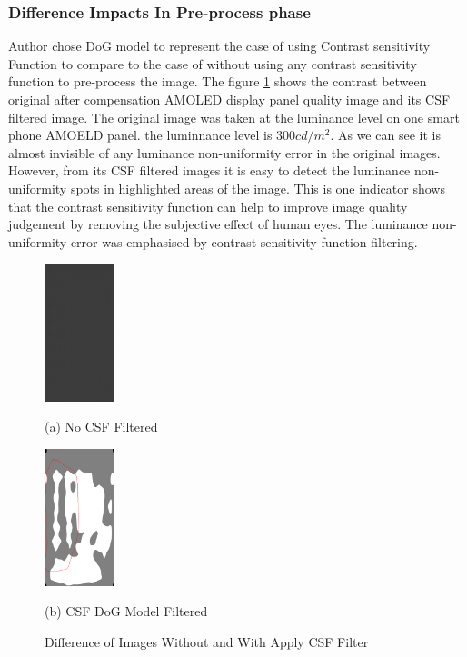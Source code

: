 \documentclass{article}
\begin{document}
\subsubsection{Difference Impacts In Pre-process phase}
Author chose DoG model to represent the case of using Contrast sensitivity Function to compare to the case of without using any contrast sensitivity function to pre-process the image.  
The figure \ref{fig3} shows the contrast between  original after compensation AMOLED display panel quality image and its CSF filtered image. The original image was taken at the luminance level on one smart phone AMOELD panel. the luminnance level is $300 cd/m^2$. As we can see it is almost invisible of any luminance non-uniformity error in the original images. However, from its CSF filtered images it is easy to detect the luminance non-uniformity spots in highlighted areas of the image. This is one indicator shows that the contrast sensitivity function can help to improve image quality judgement by removing the subjective effect of human eyes. The luminance non-uniformity error was emphasised by contrast sensitivity function filtering.

\begin{figure}[h]
\begin{minipage}[b]{.48\linewidth}
  \centering
  \centerline{\includegraphics[width=2cm]{images/A1_G_300_I3_PsdLum.csv.png}}
  \centerline{(a) No CSF Filtered}\medskip
\end{minipage}
\hfill
\begin{minipage}[b]{0.48\linewidth}
  \centering
  \centerline{\includegraphics[width=2cm]{images/DoG_csfed_A1_G_300_I3_PsdLum.csv.png}}
  \centerline{(b) CSF DoG Model Filtered}\medskip
\end{minipage}
%
\caption{Difference of Images Without and With Apply CSF Filter}
\label{fig3}
%
\end{figure}
\end{document}
